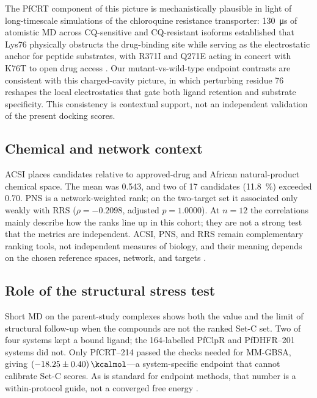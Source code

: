 \documentclass[journal=jcisd8,manuscript=article,layout=traditional]{achemso}
\begin{document}
The PfCRT component of this picture is mechanistically plausible in light of long-timescale simulations of the chloroquine resistance transporter: \qty{130}{\micro\second} of atomistic MD across CQ-sensitive and CQ-resistant isoforms established that Lys76 physically obstructs the drug-binding site while serving as the electrostatic anchor for peptide substrates, with R371I and Q271E acting in concert with K76T to open drug access \citep{tanner2025pfcrt}. Our mutant-vs-wild-type endpoint contrasts are consistent with this charged-cavity picture, in which perturbing residue \num{76} reshapes the local electrostatics that gate both ligand retention and substrate specificity. This consistency is contextual support, not an independent validation of the present docking scores.

\subsection{Chemical and network context}

ACSI places candidates relative to approved-drug and African natural-product chemical space. The mean was \num{0.543}, and two of \num{17} candidates (\qty{11.8}{\percent}) exceeded \num{0.70}. PNS is a network-weighted rank; on the two-target set it associated only weakly with RRS ($\rho=\num{-0.2098}$, adjusted $p=\num{1.0000}$). At $n=\num{12}$ the correlations mainly describe how the ranks line up in this cohort; they are not a strong test that the metrics are independent. ACSI, PNS, and RRS remain complementary ranking tools, not independent measures of biology, and their meaning depends on the chosen reference spaces, network, and targets \citep{anpdb_2026,value_addition_african_np_2025,Sentinel2025Offtarget}.

\subsection{Role of the structural stress test}

Short MD on the parent-study complexes shows both the value and the limit of structural follow-up when the compounds are not the ranked Set-C set. Two of four systems kept a bound ligand; the 164-labelled PfClpR and PfDHFR--201 systems did not. Only PfCRT--214 passed the checks needed for MM-GBSA, giving $\qty{-18.25 \pm 0.40}{\kcalmol}$---a system-specific endpoint that cannot calibrate Set-C scores. As is standard for endpoint methods, that number is a within-protocol guide, not a converged free energy \citep{wang2019_mmgbsa,gmx_mmpbsa_2021}.
\end{document}
